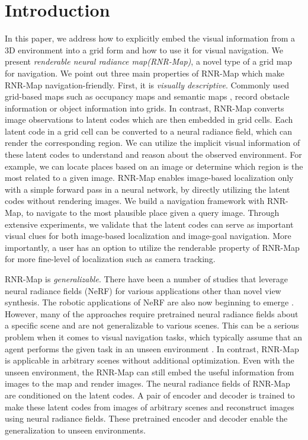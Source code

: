 \documentclass[10pt,twocolumn,letterpaper]{article}
\def\proposed{RNR-Map\xspace}
\def\proposedfullname{renderable neural radiance map\xspace}
\begin{document}
\section{Introduction}
In this paper, we address how to explicitly embed the visual information from a 3D environment into a grid form and how to use it for visual navigation. 
%
We present \textit{\proposedfullname(\proposed )}, a novel type of a grid map for navigation.%
%
We point out three main properties of \proposed which make \proposed navigation-friendly.
%
First, it is \textit{visually descriptive}.
%
Commonly used grid-based maps such as occupancy maps \cite{occ_ans, occ_lep, occ_nav} and semantic maps \cite{sem:active, sem:MultiON, semexp}, record obstacle information or object information into grids.
%
In contrast, \proposed converts image observations to latent codes which are then embedded in grid cells. 
%
Each latent code in a grid cell can be converted to a neural radiance field, which can render the corresponding region. 
%
We can utilize the implicit visual information of these latent codes to understand and reason about the observed environment.
%
For example, we can locate places based on an image or determine which region is the most related to a given image.
%
\proposed enables image-based localization only with a simple forward pass in a neural network, by directly utilizing the latent codes without rendering images.
%
We build a navigation framework with \proposed, to navigate to the most plausible place given a query image.
%
Through extensive experiments, we validate that the latent codes can serve as important visual clues for both image-based localization and image-goal navigation.
%
More importantly, a user has an option to utilize the renderable property of \proposed  for more fine-level of localization such as camera tracking.

\proposed is \textit{generalizable}.
%
There have been a number of studies that leverage neural radiance fields (NeRF) for various applications other than novel view synthesis.
%
The robotic applications of NeRF are also now beginning to emerge \cite{imap, nice-slam, nerf-navi, nerf-rl, nerf-loc}. 
%
However, many of the approaches require pretrained neural radiance fields about a specific scene and are not generalizable to various scenes.
%
This can be a serious problem when it comes to visual navigation tasks, which typically assume that an agent performs the given task in an unseen environment \cite{embodied_survey}.
%
In contrast, \proposed is applicable in arbitrary scenes without additional optimization.
%
Even with the unseen environment, the \proposed can still embed the useful information from images to the map and render images.
%
The neural radiance fields of \proposed are conditioned on the latent codes.
%
A pair of encoder and decoder is trained to make these latent codes from images of arbitrary scenes and reconstruct images using neural radiance fields.
%
These pretrained encoder and decoder enable the generalization to unseen environments.
\end{document}
